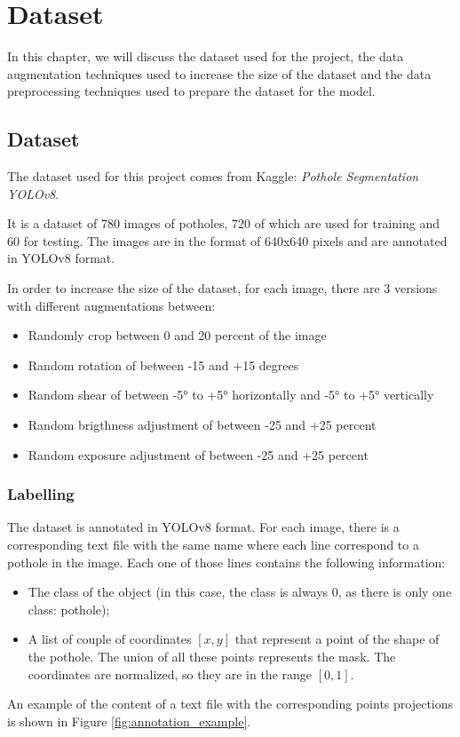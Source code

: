\chapter{Dataset}

In this chapter, we will discuss the dataset used for the project, the data augmentation techniques used to increase the size of the dataset and the data preprocessing techniques used to prepare the dataset for the model.


\section*{Dataset}
The dataset used for this project comes from Kaggle: \textit{Pothole Segmentation YOLOv8}. 

It is a dataset of 780 images of potholes, 720 of which are used for training and 60 for testing. 
The images are in the format of 640x640 pixels and are annotated in YOLOv8 format. 

In order to increase the size of the dataset, for each image, there are 3 versions with different augmentations between:
\begin{itemize}
    \item Randomly crop between 0 and 20 percent of the image
    \item Random rotation of between -15 and +15 degrees
    \item Random shear of between -5° to +5° horizontally and -5° to +5° vertically
    \item Random brigthness adjustment of between -25 and +25 percent
    \item Random exposure adjustment of between -25 and +25 percent
\end{itemize}



\subsection*{Labelling}
The dataset is annotated in YOLOv8 format.
For each image, there is a corresponding text file with the same name where each line correspond to a pothole in the image. Each one of those lines contains the following information:
\begin{itemize}
    \item The class of the object (in this case, the class is always 0, as there is only one class: pothole);
    \item A list of couple of coordinates $[x, y]$ that represent a point of the shape of the pothole. The union of all these points represents the mask. The coordinates are normalized, so they are in the range $[0, 1]$.
\end{itemize}
An example of the content of a text file with the corresponding points projections is shown in Figure \ref{fig:annotation_example}.


